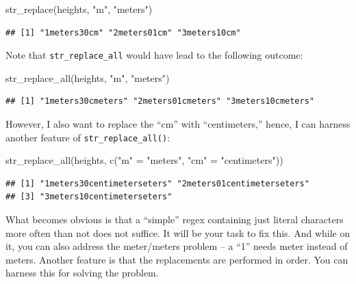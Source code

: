 \documentclass[
]{book}
\newenvironment{Shaded}{\begin{snugshade}}{\end{snugshade}}
\newcommand{\FunctionTok}[1]{\textcolor[rgb]{0.00,0.00,0.00}{#1}}
\newcommand{\NormalTok}[1]{#1}
\newcommand{\OtherTok}[1]{\textcolor[rgb]{0.56,0.35,0.01}{#1}}
\newcommand{\StringTok}[1]{\textcolor[rgb]{0.31,0.60,0.02}{#1}}
\begin{document}
\begin{Shaded}
\begin{Highlighting}[]
\FunctionTok{str\_replace}\NormalTok{(heights, }\StringTok{"m"}\NormalTok{, }\StringTok{"meters"}\NormalTok{)}
\end{Highlighting}
\end{Shaded}

\begin{verbatim}
## [1] "1meters30cm" "2meters01cm" "3meters10cm"
\end{verbatim}

Note that \texttt{str\_replace\_all} would have lead to the following outcome:

\begin{Shaded}
\begin{Highlighting}[]
\FunctionTok{str\_replace\_all}\NormalTok{(heights, }\StringTok{"m"}\NormalTok{, }\StringTok{"meters"}\NormalTok{)}
\end{Highlighting}
\end{Shaded}

\begin{verbatim}
## [1] "1meters30cmeters" "2meters01cmeters" "3meters10cmeters"
\end{verbatim}

However, I also want to replace the ``cm'' with ``centimeters,'' hence, I can harness another feature of \texttt{str\_replace\_all()}:

\begin{Shaded}
\begin{Highlighting}[]
\FunctionTok{str\_replace\_all}\NormalTok{(heights, }\FunctionTok{c}\NormalTok{(}\StringTok{"m"} \OtherTok{=} \StringTok{"meters"}\NormalTok{, }\StringTok{"cm"} \OtherTok{=} \StringTok{"centimeters"}\NormalTok{))}
\end{Highlighting}
\end{Shaded}

\begin{verbatim}
## [1] "1meters30centimeterseters" "2meters01centimeterseters"
## [3] "3meters10centimeterseters"
\end{verbatim}

What becomes obvious is that a ``simple'' regex containing just literal characters more often than not does not suffice. It will be your task to fix this. And while on it, you can also address the meter/meters problem -- a ``1'' needs meter instead of meters. Another feature is that the replacements are performed in order. You can harness this for solving the problem.
\end{document}
